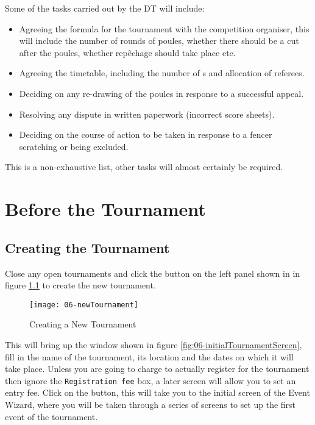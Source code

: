 \documentclass[a4paper,11pt]{memoir}
\begin{document}
Some of the tasks carried out by the DT will include:

\begin{itemize}
 \item Agreeing the formula for the tournament with the competition organiser, this will include the number of rounds of poules, whether there should be a cut after the poules, whether repêchage should take place etc.
 \item Agreeing the timetable, including the number of s and allocation of referees.
 \item Deciding on any re-drawing of the poules in response to a successful appeal.
 \item Resolving any dispute in written paperwork (incorrect score sheets).
 \item Deciding on the course of action to be taken in response to a fencer scratching or being excluded.
\end{itemize}

This is a non-exhaustive list, other tasks will almost certainly be required.

\chapter{Before the Tournament}
\section{Creating the Tournament}

Close any open tournaments and click the  button on the left panel shown in in figure \ref{fig:06-newTournament} to create the new tournament.

\begin{figure}
 \centering
 \texttt{[image: 06-newTournament]}
 \caption{Creating a New Tournament} \label{fig:06-newTournament}
\end{figure}

This will bring up the window shown in figure \ref{fig:06-initialTournamentScreen}, fill in the name of the tournament, its location and the dates on which it will take place. Unless you are going to charge to actually register for the tournament then ignore the \texttt{Registration fee} box, a later screen will allow you to set an entry fee. Click on the  button, this will take you to the initial screen of the Event Wizard, where you will be taken through a series of screens to set up the first event of the tournament.
\end{document}
